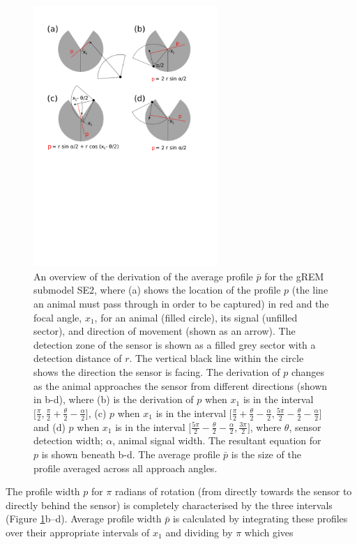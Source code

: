\documentclass[a4paper,10pt,reqno,oneside]{amsart}
\begin{document}
\begin{figure}[t]
        \centering
	\includegraphics[width=7cm]{imgs/fourIntegrals.pdf}
\caption{An overview of the derivation of the average profile $\bar{p}$ for the gREM submodel SE2, where (a) shows the location of the profile $p$ (the line an animal must pass through in order to be captured) in red and the focal angle, $x_1$, for an animal (filled circle), its signal (unfilled sector), and direction of movement (shown as an arrow). The detection zone of the sensor is shown as a filled grey sector with a detection distance of $r$. The vertical black line within the circle shows the direction the sensor is facing. The derivation of $p$ changes as the animal approaches the sensor from different directions (shown in b-d), where (b) is the derivation of $p$ when $x_1$ is in the interval $\lbrack\frac{\pi}{2}, \frac{\pi}{2} + \frac{\theta}{2} - \frac{\alpha}{2}\rbrack$, (c)  $p$ when $x_1$ is in the interval $\lbrack\frac{\pi}{2} + \frac{\theta}{2} - \frac{\alpha}{2}, \frac{5 \pi}{2} - \frac{\theta}{2} - \frac{\alpha}{2} \rbrack$ and (d) $p$ when $x_1$ is in the interval $\lbrack\frac{5 \pi}{2} - \frac{\theta}{2} - \frac{\alpha}{2}, \frac{3 \pi}{2}\rbrack$, where $\theta$, sensor detection width; $\alpha$, animal signal width. The resultant equation for $p$ is shown beneath b-d. The average profile $\bar{p}$ is the size of the profile averaged across all approach angles.}
 	\label{f:x1AndInt}

\end{figure}

The profile width $p$ for $\pi$ radians of rotation (from directly towards the sensor to directly behind the sensor) is completely characterised by the three intervals (Figure \ref{f:x1AndInt}b--d). Average profile width $\bar{p}$ is calculated by integrating these profiles over their appropriate intervals of $x_1$ and dividing by $\pi$ which gives
\end{document}

